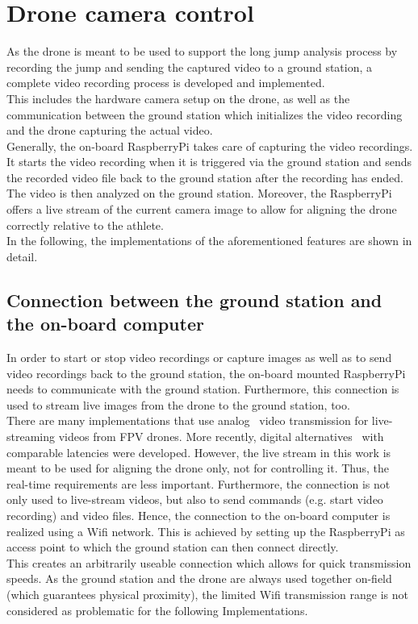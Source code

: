 \section{Drone camera control}\label{subsec:4_live_stream}
As the drone is meant to be used to support the long jump analysis process by
recording the jump and sending the captured video to a ground station, a
complete video recording process is developed and implemented.\\
This includes the hardware camera setup on the drone, as well as the
communication between the ground station which initializes the video
recording and the drone capturing the actual video.\\
Generally, the on-board RaspberryPi takes care of capturing the video
recordings.
It starts the video recording when it is triggered via the ground station and
sends the recorded video file back to the ground station after the recording
has ended.
The video is then analyzed on the ground station.
Moreover, the RaspberryPi offers a live stream of the current camera image to
allow for aligning the drone correctly relative to the athlete.\\
In the following, the implementations of the aforementioned features are shown
in detail.

\subsection{Connection between the ground station and the on-board computer}\label{subsec:4_pi_wifi}
In order to start or stop video recordings or capture images as well as to
send video recordings back to the ground station, the on-board mounted
RaspberryPi needs to communicate with the ground station.
Furthermore, this connection is used to stream live images from the drone to
the ground station, too.\\
There are many implementations that use
analog~\cite{tecpoyotl-torresRealtimeVideoTransmission2021} video transmission
for live-streaming videos from \ac{FPV} drones.
More recently, digital alternatives~\cite{silicQoEAssessmentFPV2021} with
comparable latencies were developed.
However, the live stream in this work is meant to be used for aligning the
drone only, not for controlling it.
Thus, the real-time requirements are less important.
Furthermore, the connection is not only used to live-stream videos, but also
to send commands (e.g. start video recording) and video files.
Hence, the connection to the on-board computer is realized using a Wifi
network.
This is achieved by setting up the RaspberryPi as access point to which the
ground station can then connect directly.\\
This creates an arbitrarily useable connection which allows for quick
transmission speeds.
As the ground station and the drone are always used together on-field (which
guarantees physical proximity), the limited Wifi transmission range is not
considered as problematic for the following Implementations.

